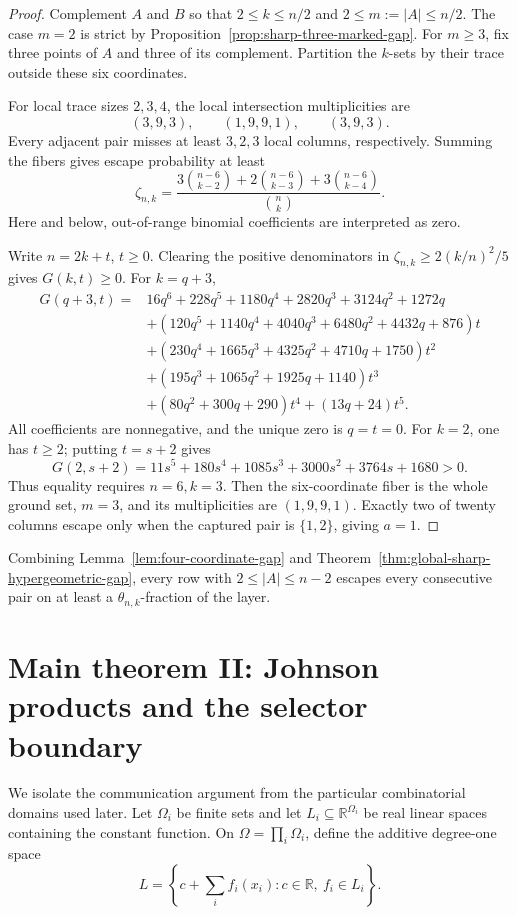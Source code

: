 \documentclass[11pt]{article}
\theoremstyle{definition}
\theoremstyle{remark}
\newcommand{\R}{\mathbb R}
\newcommand{\1}{\mathbf 1}
\begin{document}
\begin{proof}
Complement \(A\) and \(B\) so that \(2\le k\le n/2\) and
\(2\le m:=|A|\le n/2\).  The case \(m=2\) is strict by
Proposition~\ref{prop:sharp-three-marked-gap}.  For \(m\ge3\), fix three
points of \(A\) and three of its complement.  Partition the \(k\)-sets by
their trace outside these six coordinates.

For local trace sizes \(2,3,4\), the local intersection multiplicities are
\[
 (3,9,3),\qquad(1,9,9,1),\qquad(3,9,3).
\]
Every adjacent pair misses at least \(3,2,3\) local columns, respectively.
Summing the fibers gives escape probability at least
\[
 \zeta_{n,k}
 =
 \frac{3\binom{n-6}{k-2}
 +2\binom{n-6}{k-3}
 +3\binom{n-6}{k-4}}{\binom nk}.
\]
Here and below, out-of-range binomial coefficients are interpreted as zero.

Write \(n=2k+t\), \(t\ge0\).  Clearing the positive denominators in
\(\zeta_{n,k}\ge2(k/n)^2/5\) gives \(G(k,t)\ge0\).  For \(k=q+3\),
\[
\begin{aligned}
G(q+3,t)={}&16q^6+228q^5+1180q^4+2820q^3+3124q^2+1272q\\
&+(120q^5+1140q^4+4040q^3+6480q^2+4432q+876)t\\
&+(230q^4+1665q^3+4325q^2+4710q+1750)t^2\\
&+(195q^3+1065q^2+1925q+1140)t^3\\
&+(80q^2+300q+290)t^4+(13q+24)t^5.
\end{aligned}
\]
All coefficients are nonnegative, and the unique zero is \(q=t=0\).
For \(k=2\), one has \(t\ge2\); putting \(t=s+2\) gives
\[
G(2,s+2)
=11s^5+180s^4+1085s^3+3000s^2+3764s+1680>0.
\]
Thus equality requires \(n=6,k=3\).  Then the six-coordinate fiber is the
whole ground set, \(m=3\), and its multiplicities are \((1,9,9,1)\).
Exactly two of twenty columns escape only when the captured pair is
\(\{1,2\}\), giving \(a=1\).
\end{proof}


Combining Lemma~\ref{lem:four-coordinate-gap} and
Theorem~\ref{thm:global-sharp-hypergeometric-gap}, every row with
$2\le|A|\le n-2$ escapes every consecutive pair on at least a
$\theta_{n,k}$-fraction of the layer.

\section{Main theorem II: Johnson products and the selector boundary}

We isolate the communication argument from the particular combinatorial
domains used later.  Let $\Omega_i$ be finite sets and let
$L_i\subseteq\R^{\Omega_i}$ be real linear spaces containing the constant
function.  On $\Omega=\prod_i\Omega_i$, define the additive degree-one space
\[
 L=\left\{c+\sum_i f_i(x_i):c\in\R,\ f_i\in L_i\right\}.
\]
\end{document}
